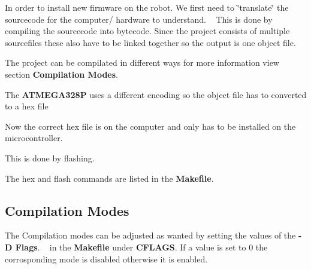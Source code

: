 \begin{DoxyItemize}
\item In order to install new firmware on the robot. We first need to \char`\"{}translate\char`\"{} the sourcecode for the computer/ hardware to understand. ~\newline
 This is done by compiling the sourcecode into bytecode. Since the project consists of multiple sourcefiles these also have to be linked together so the output is one object file. ~\newline

\item The project can be compilated in different ways for more information view section {\bfseries Compilation Modes}. ~\newline

\item The {\bfseries A\+T\+M\+E\+G\+A328P} uses a different encoding so the object file has to converted to a hex file ~\newline

\item Now the correct hex file is on the computer and only has to be installed on the microcontroller.
\item This is done by flashing.
\item The hex and flash commands are listed in the {\bfseries Makefile}.
\end{DoxyItemize}\hypertarget{index_comp}{}\subsection{Compilation Modes}\label{index_comp}
The Compilation modes can be adjusted as wanted by setting the values of the {\bfseries -\/ D Flags}. ~\newline
 in the {\bfseries Makefile} under {\bfseries C\+F\+L\+A\+GS}. If a value is set to 0 the corrosponding mode is disabled otherwise it is enabled. ~\newline

